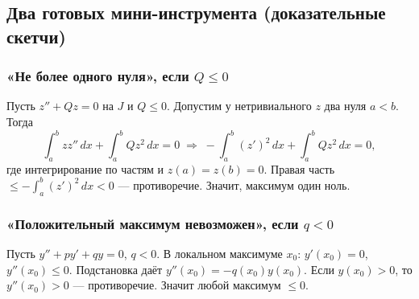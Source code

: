 \subsection{Два готовых мини-инструмента (доказательные скетчи)}\label{sec:ode2-mini-tools}

\subsubsection{«Не более одного нуля», если $Q\le 0$}

Пусть $z''+Qz=0$ на $J$ и $Q\le0$. Допустим у нетривиального $z$ два нуля $a<b$. Тогда
\[
\int_a^b z z''\,dx + \int_a^b Q z^2\,dx = 0
\;\Rightarrow\;
-\int_a^b (z')^2\,dx + \int_a^b Q z^2\,dx = 0,
\]
где интегрирование по частям и $z(a)=z(b)=0$.
Правая часть $\le -\int_a^b (z')^2\,dx<0$ — противоречие. Значит, максимум один ноль.

\subsubsection{«Положительный максимум невозможен», если $q<0$}

Пусть $y''+p y'+q y=0$, $q<0$. В локальном максимуме $x_0$: $y'(x_0)=0$, $y''(x_0)\le 0$.
Подстановка даёт $y''(x_0)=-q(x_0)y(x_0)$. Если $y(x_0)>0$, то $y''(x_0)>0$ — противоречие.
Значит любой максимум $\le 0$.
